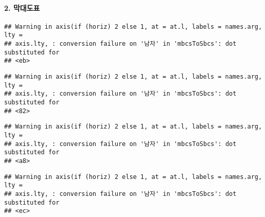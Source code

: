 \documentclass[
]{article}
\newenvironment{Shaded}{\begin{snugshade}}{\end{snugshade}}
\newcommand{\AttributeTok}[1]{\textcolor[rgb]{0.13,0.29,0.53}{#1}}
\newcommand{\CommentTok}[1]{\textcolor[rgb]{0.56,0.35,0.01}{\textit{#1}}}
\newcommand{\DecValTok}[1]{\textcolor[rgb]{0.00,0.00,0.81}{#1}}
\newcommand{\FunctionTok}[1]{\textcolor[rgb]{0.13,0.29,0.53}{\textbf{#1}}}
\newcommand{\NormalTok}[1]{#1}
\newcommand{\OtherTok}[1]{\textcolor[rgb]{0.56,0.35,0.01}{#1}}
\newcommand{\SpecialCharTok}[1]{\textcolor[rgb]{0.81,0.36,0.00}{\textbf{#1}}}
\newcommand{\StringTok}[1]{\textcolor[rgb]{0.31,0.60,0.02}{#1}}
\begin{document}
\hypertarget{uxb9c9uxb300uxb3c4uxd45c}{%
\paragraph{2. 막대도표}\label{uxb9c9uxb300uxb3c4uxd45c}}

\begin{Shaded}
\end{Shaded}

\begin{verbatim}
## Warning in axis(if (horiz) 2 else 1, at = at.l, labels = names.arg, lty =
## axis.lty, : conversion failure on '남자' in 'mbcsToSbcs': dot substituted for
## <eb>
\end{verbatim}

\begin{verbatim}
## Warning in axis(if (horiz) 2 else 1, at = at.l, labels = names.arg, lty =
## axis.lty, : conversion failure on '남자' in 'mbcsToSbcs': dot substituted for
## <82>
\end{verbatim}

\begin{verbatim}
## Warning in axis(if (horiz) 2 else 1, at = at.l, labels = names.arg, lty =
## axis.lty, : conversion failure on '남자' in 'mbcsToSbcs': dot substituted for
## <a8>
\end{verbatim}

\begin{verbatim}
## Warning in axis(if (horiz) 2 else 1, at = at.l, labels = names.arg, lty =
## axis.lty, : conversion failure on '남자' in 'mbcsToSbcs': dot substituted for
## <ec>
\end{verbatim}
\end{document}
